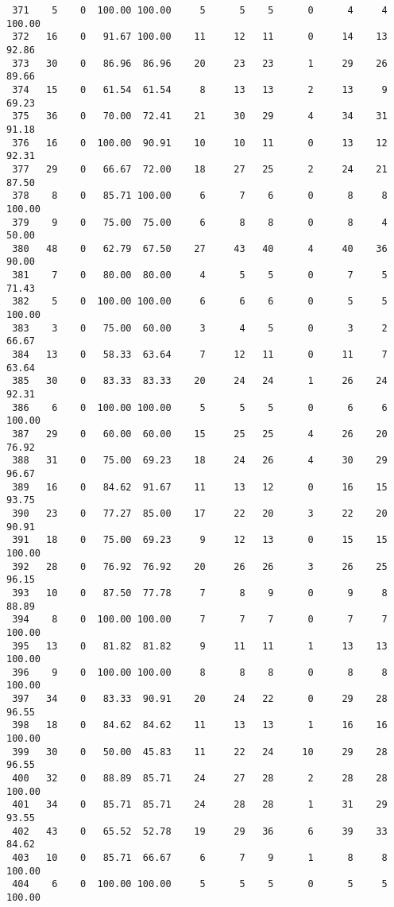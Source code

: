 \begin{verbatim}
 371    5    0  100.00 100.00     5      5    5      0      4     4   100.00
 372   16    0   91.67 100.00    11     12   11      0     14    13    92.86
 373   30    0   86.96  86.96    20     23   23      1     29    26    89.66
 374   15    0   61.54  61.54     8     13   13      2     13     9    69.23
 375   36    0   70.00  72.41    21     30   29      4     34    31    91.18
 376   16    0  100.00  90.91    10     10   11      0     13    12    92.31
 377   29    0   66.67  72.00    18     27   25      2     24    21    87.50
 378    8    0   85.71 100.00     6      7    6      0      8     8   100.00
 379    9    0   75.00  75.00     6      8    8      0      8     4    50.00
 380   48    0   62.79  67.50    27     43   40      4     40    36    90.00
 381    7    0   80.00  80.00     4      5    5      0      7     5    71.43
 382    5    0  100.00 100.00     6      6    6      0      5     5   100.00
 383    3    0   75.00  60.00     3      4    5      0      3     2    66.67
 384   13    0   58.33  63.64     7     12   11      0     11     7    63.64
 385   30    0   83.33  83.33    20     24   24      1     26    24    92.31
 386    6    0  100.00 100.00     5      5    5      0      6     6   100.00
 387   29    0   60.00  60.00    15     25   25      4     26    20    76.92
 388   31    0   75.00  69.23    18     24   26      4     30    29    96.67
 389   16    0   84.62  91.67    11     13   12      0     16    15    93.75
 390   23    0   77.27  85.00    17     22   20      3     22    20    90.91
 391   18    0   75.00  69.23     9     12   13      0     15    15   100.00
 392   28    0   76.92  76.92    20     26   26      3     26    25    96.15
 393   10    0   87.50  77.78     7      8    9      0      9     8    88.89
 394    8    0  100.00 100.00     7      7    7      0      7     7   100.00
 395   13    0   81.82  81.82     9     11   11      1     13    13   100.00
 396    9    0  100.00 100.00     8      8    8      0      8     8   100.00
 397   34    0   83.33  90.91    20     24   22      0     29    28    96.55
 398   18    0   84.62  84.62    11     13   13      1     16    16   100.00
 399   30    0   50.00  45.83    11     22   24     10     29    28    96.55
 400   32    0   88.89  85.71    24     27   28      2     28    28   100.00
 401   34    0   85.71  85.71    24     28   28      1     31    29    93.55
 402   43    0   65.52  52.78    19     29   36      6     39    33    84.62
 403   10    0   85.71  66.67     6      7    9      1      8     8   100.00
 404    6    0  100.00 100.00     5      5    5      0      5     5   100.00

\end{verbatim}
